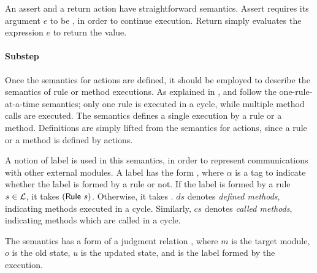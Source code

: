 An assert and a return action have straightforward semantics. Assert
requires its argument $e$ to be \btrue{}, in order to continue
execution. Return simply evaluates the expression $e$ to return the
value.

\paragraph{Substep}
Once the semantics for actions are defined, it should be employed to
describe the semantics of rule or method executions. As explained in
, \Bluespec{} and \Kami{} follow the
one-rule-at-a-time semantics; only one rule is executed in a cycle,
while multiple method calls are executed. The \Substep{} semantics
defines a single execution by a rule or a method. Definitions are
simply lifted from the semantics for actions, since a rule or a method
is defined by actions.

A notion of label is used in this semantics, in order to represent
communications with other external modules. A label has the form
, where $\alpha$ is a tag to indicate whether
the label is formed by a rule or not. If the label is formed by a rule
$s \in \mathcal{L}$, it takes $(\textsf{Rule}\ s)$. Otherwise, it takes
\alphameth{}. $ds$ denotes \emph{defined methods}, indicating methods
executed in a cycle. Similarly, $cs$ denotes \emph{called methods},
indicating methods which are called in a cycle.

The \Substep{} semantics has a form of a judgment relation
, where $m$ is the target module,
$o$ is the old state, $u$ is the updated state, and
 is the label formed by the execution.

